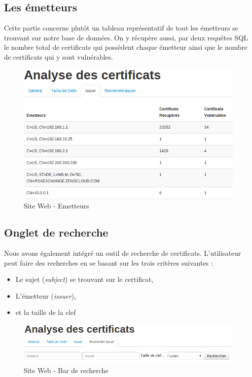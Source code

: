 \subsection{Les émetteurs}

Cette partie concerne plutôt un tableau représentatif de tout les émetteurs se trouvant sur notre base de données. On y récupère aussi, par deux requêtes SQL le nombre total de certificats qui possèdent chaque émetteur ainsi que le nombre de certificats qui y sont vulnérables.

\begin{figure}[H]
\begin{center}
\includegraphics[scale=0.5]{images/site_web_issuer.png}
\end{center}
\caption{Site Web - Emetteurs}
\label{issuer}
\end{figure}

\subsection{Onglet de recherche}

Nous avons également intégré un outil de recherche de certificats. L'utilisateur peut faire des recherches en se basant sur les trois critères suivantes :
\begin{itemize}
\item Le sujet (\textit{subject}) se trouvant sur le certificat,
\item L'émetteur (\textit{issuer}),
\item et la taille de la clef\\
\end{itemize}

\begin{figure}[H]
\begin{center}
\includegraphics[scale=0.5]{images/site_web_search_bar.png}
\end{center}
\caption{Site Web - Bar de recherche}
\label{search_bar}
\end{figure}

